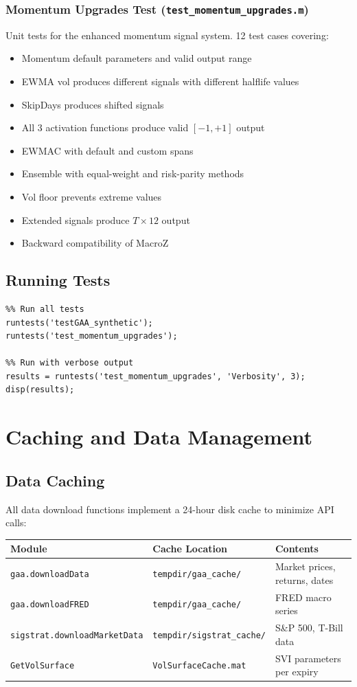 \documentclass[11pt,a4paper]{article}
\begin{document}
\subsubsection{Momentum Upgrades Test (\texttt{test\_momentum\_upgrades.m})}
Unit tests for the enhanced momentum signal system. 12 test cases covering:
\begin{itemize}[leftmargin=2em]
  \item Momentum default parameters and valid output range
  \item EWMA vol produces different signals with different halflife values
  \item SkipDays produces shifted signals
  \item All 3 activation functions produce valid $[-1,+1]$ output
  \item EWMAC with default and custom spans
  \item Ensemble with equal-weight and risk-parity methods
  \item Vol floor prevents extreme values
  \item Extended signals produce $T \times 12$ output
  \item Backward compatibility of MacroZ
\end{itemize}

\subsection{Running Tests}
\begin{lstlisting}
%% Run all tests
runtests('testGAA_synthetic');
runtests('test_momentum_upgrades');

%% Run with verbose output
results = runtests('test_momentum_upgrades', 'Verbosity', 3);
disp(results);
\end{lstlisting}
\newpage
\section{Caching and Data Management}

\subsection{Data Caching}
All data download functions implement a 24-hour disk cache to minimize API calls:
\begin{center}
\begin{tabularx}{\textwidth}{l l X}
\toprule
\textbf{Module} & \textbf{Cache Location} & \textbf{Contents} \\
\midrule
\texttt{gaa.downloadData} & \texttt{tempdir/gaa\_cache/} & Market prices, returns, dates \\
\texttt{gaa.downloadFRED} & \texttt{tempdir/gaa\_cache/} & FRED macro series \\
\texttt{sigstrat.downloadMarketData} & \texttt{tempdir/sigstrat\_cache/} & S\&P 500, T-Bill data \\
\texttt{GetVolSurface} & \texttt{VolSurfaceCache.mat} & SVI parameters per expiry \\
\bottomrule
\end{tabularx}
\end{center}
\end{document}

